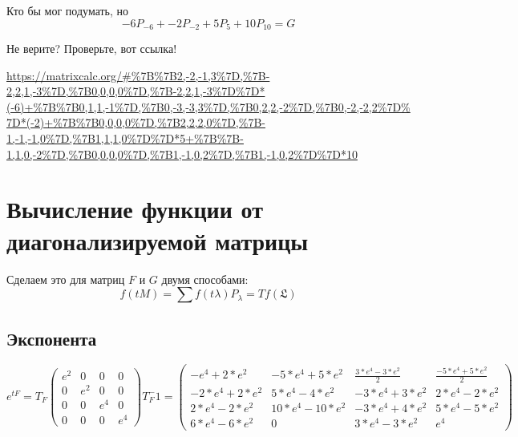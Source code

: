\documentclass[12pt, a4paper]{article}
\begin{document}
    Кто бы мог подумать, но 
    \begin{equation}
        -6 P_{-6} + -2 P_{-2} + 5 P_{5} + 10 P_{10} = G
    \end{equation}


    Не верите? Проверьте, вот ссылка!

    \url{https://matrixcalc.org/#%7B%7B2,-2,-1,3%7D,%7B-2,2,1,-3%7D,%7B0,0,0,0%7D,%7B-2,2,1,-3%7D%7D*(-6)+%7B%7B0,1,1,-1%7D,%7B0,-3,-3,3%7D,%7B0,2,2,-2%7D,%7B0,-2,-2,2%7D%7D*(-2)+%7B%7B0,0,0,0%7D,%7B2,2,2,0%7D,%7B-1,-1,-1,0%7D,%7B1,1,1,0%7D%7D*5+%7B%7B-1,1,0,-2%7D,%7B0,0,0,0%7D,%7B1,-1,0,2%7D,%7B1,-1,0,2%7D%7D*10}

    



    \section{Вычисление функции от диагонализируемой матрицы}

    Сделаем это для матриц $F$ и $G$ двумя способами:
    \begin{equation}
        f(t M) = \sum {f(t\lambda) P_\lambda} = T f(\mathfrak{L})
    \end{equation}

    \subsection{Экспонента}

    \begin{equation}
        e^{t F} = T_F \left(\begin{matrix}
            e^2 & 0 & 0 & 0 \\
            0 & e^2 & 0 & 0 \\
            0 & 0 & e^4 & 0 \\
            0 & 0 & 0 & e^4
        \end{matrix}\right) T_F^-1 = 
        \left(\begin{matrix}
            -e^4+2*e^2 & -5*e^4+5*e^2 & \frac{3*e^4-3*e^2}{2} & \frac{-5*e^4+5*e^2}{2} \\
            -2*e^4+2*e^2 & 5*e^4-4*e^2 & -3*e^4+3*e^2 & 2*e^4-2*e^2 \\
            2*e^4-2*e^2 & 10*e^4-10*e^2 & -3*e^4+4*e^2 & 5*e^4-5*e^2 \\
            6*e^4-6*e^2 & 0 & 3*e^4-3*e^2 & e^4
        \end{matrix}\right)
    \end{equation}
\end{document}
